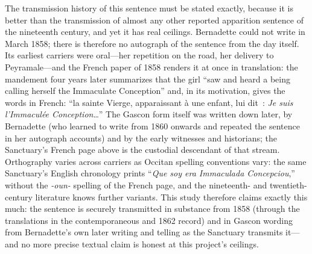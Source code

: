 The transmission history of this sentence must be stated exactly,
because it is better than the transmission of almost any other
reported apparition sentence of the nineteenth century, and yet it
has real ceilings. Bernadette could not write in March 1858; there
is therefore no autograph of the sentence from the day itself. Its
earliest carriers were oral---her repetition on the road, her
delivery to Peyramale---and the French paper of 1858 renders it at
once in translation: the mandement four years later summarizes that
the girl ``saw and heard a being calling herself the Immaculate
Conception'' and, in its motivation, gives the words in French:
``la sainte Vierge, apparaissant \`a une enfant, lui dit~: \emph{Je
suis l'Immacul\'ee Conception}\ldots'' The Gascon form itself was written down later, by
Bernadette (who learned to write from 1860 onwards and repeated the
sentence in her autograph accounts) and by the early witnesses and
historians; the Sanctuary's French page above is the custodial
descendant of that stream. Orthography varies across carriers as
Occitan spelling conventions vary: the same Sanctuary's English
chronology prints ``\emph{Que soy era Immaculada Concepciou},''
without the \emph{-oun-} spelling of the French page, and the
nineteenth- and twentieth-century literature knows further
variants.
This study therefore claims exactly this much: the sentence is
securely transmitted in substance from 1858 (through the
translations in the contemporaneous and 1862 record) and in Gascon
wording from Bernadette's own later writing and telling as the
Sanctuary transmits it---and no more precise textual claim is
honest at this project's ceilings.

